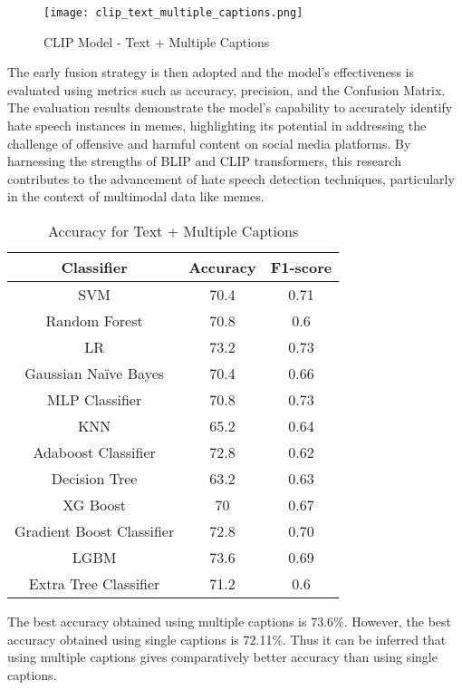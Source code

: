 \documentclass{ieeeaccess}
\begin{document}
\begin{figure}[htbp]
\centering
\texttt{[image: clip\_text\_multiple\_captions.png]}
\caption{CLIP Model - Text + Multiple Captions}
\label{fig:clip_text_multiple_captions}
\end{figure}

The early fusion strategy is then adopted and the model's effectiveness is evaluated using metrics such as accuracy, precision, and the Confusion Matrix. The evaluation results demonstrate the model's capability to accurately identify hate speech instances in memes, highlighting its potential in addressing the challenge of offensive and harmful content on social media platforms. By harnessing the strengths of BLIP and CLIP transformers, this research contributes to the advancement of hate speech detection techniques, particularly in the context of multimodal data like memes.

\begin{table}[htbp]
\caption{Accuracy for Text + Multiple Captions}
\label{tab:text_multiple_captions_accuracy}
\centering
\begin{tabular}{|c|c|c|}
\hline
\textbf{Classifier} & \textbf{Accuracy} & \textbf{F1-score} \\
\hline
SVM & 70.4 & 0.71 \\
Random Forest & 70.8 & 0.6 \\
LR & 73.2 & 0.73 \\
Gaussian Naïve Bayes & 70.4 & 0.66 \\
MLP Classifier & 70.8 & 0.73 \\
KNN & 65.2 & 0.64 \\
Adaboost Classifier & 72.8 & 0.62 \\
Decision Tree & 63.2 & 0.63 \\
XG Boost & 70 & 0.67 \\
Gradient Boost Classifier & 72.8 & 0.70 \\
LGBM & 73.6 & 0.69 \\
Extra Tree Classifier & 71.2 & 0.6 \\
\hline
\end{tabular}
\end{table}

The best accuracy obtained using multiple captions is 73.6\%. However, the best accuracy obtained using single captions is 72.11\%. Thus it can be inferred that using multiple captions gives comparatively better accuracy than using single captions.
\end{document}
